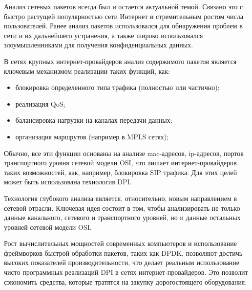 \Introduction
Анализ сетевых пакетов всегда был и остается актуальной темой. Связано это с быстро растущей популярностью сети Интернет и стремительным ростом числа пользователей. Ранее анализ пакетов использовался для обнаружения проблем в сети и их дальнейшего устранения, а также широко использовался злоумышленниками для получения конфиденциальных данных.

В сетях крупных интернет-провайдеров анализ содержимого пакетов является ключевым механизмом реализации таких функций, как:
\begin{itemize}
\item блокировка определенного типа трафика (полностью или частично);
\item реализация QoS;
\item балансировка нагрузки на каналах передачи данных;
\item организация маршрутов (например в MPLS сетях);
\end{itemize}

Обычно, все эти функции основаны на анализе mac-адресов, ip-адресов, портов транспортного уровня сетевой модели OSI, что лишает интернет-провайдеров таких возможностей, как, например, блокировка SIP трафика. Для этих целей может быть использована технология DPI.

Технология глубокого анализа является, относительно, новым направлением в сетевой отрасли. Ключевая идея состоит в том, чтобы анализировать не только данные канального, сетевого и транспортного уровней, но и данные остальных уровней сетевой модели OSI.

Рост вычислительных мощностей современных компьютеров и использование фреймворков быстрой обработки пакетов, таких как DPDK, позволяют достичь высоких показателей производительности, что делает реальным использование чисто программных реализаций DPI в сетях интернет-провайдеров. Это позволит сэкономить средства, которые тратятся на закупку дорогостоящего оборудования.

